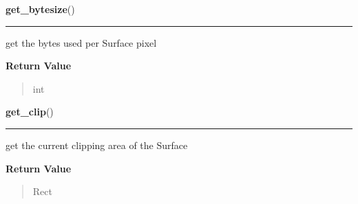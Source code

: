 \hspace{.8\funcindent}\begin{boxedminipage}{\funcwidth}

    \raggedright \textbf{get\_bytesize}()

    \vspace{-1.5ex}

    \rule{\textwidth}{0.5\fboxrule}
\setlength{\parskip}{2ex}
    get the bytes used per Surface pixel

\setlength{\parskip}{1ex}
      \textbf{Return Value}
    \vspace{-1ex}

      \begin{quote}
      int

      \end{quote}

    \end{boxedminipage}

    \label{pygame:Surface:get_clip}

    \vspace{0.5ex}

\hspace{.8\funcindent}\begin{boxedminipage}{\funcwidth}

    \raggedright \textbf{get\_clip}()

    \vspace{-1.5ex}

    \rule{\textwidth}{0.5\fboxrule}
\setlength{\parskip}{2ex}
    get the current clipping area of the Surface

\setlength{\parskip}{1ex}
      \textbf{Return Value}
    \vspace{-1ex}

      \begin{quote}
      Rect

      \end{quote}

    \end{boxedminipage}

    \label{pygame:Surface:get_colorkey}

    \vspace{0.5ex}

